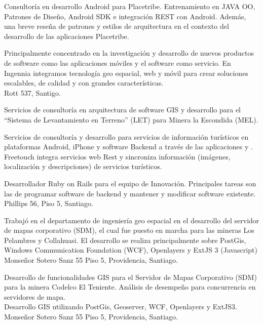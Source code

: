 \documentclass[11pt,letterpaper,roman]{moderncv}
\begin{document}
 {\tchr} {\placetribe} {\stgo} {}
{Consultoría en desarrollo Android para Placetribe. Entrenamiento en JAVA OO,
Patrones de Diseño, Android SDK e integración REST con Android. Además, una
breve reseña de patrones y estilos de arquitectura en el contexto del desarrollo
de las aplicaciones Placetribe.}


 {\cf} {\ingennia} {\stgo} {}
{Principalmente concentrado en la investigación y desarrollo de nuevos productos
de software como las aplicaciones móviles y el software como servicio. En
Ingennia integramos tecnología geo espacial, web y móvil para crear soluciones
escalables, de calidad y con grandes características. \\ Rott 537, Santigo.}

 {\scd} {\jobbitgames} {\stgo} {}
{Servicios de consultoría en arquitectura de software GIS y desarrollo para el
``Sistema de Levantamiento en Terreno'' (LET) para Minera la Escondida (MEL).}


 {\scd} {\mataveri} {\stgo} {}
{Servicios de consultoría y desarrollo para servicios de información turísticos en
plataformas Android, iPhone y software Backend a través de las aplicaciones
\freetouchchile y \freetouchperu. Freetouch integra servicios web Rest y
sincroniza información (imágenes, localización y descripciones) de servicios
turísticos.}

 {\se} {\multicaja} {\stgo} {}
{Desarrollador Ruby on Rails para el equipo de Innovación. Principales tareas
son las de programar software de backend y mantener y modificar software
existente. \\ Phillips 56, Piso 5, Santiago.}


 {\sd} {\ikom} {\stgo} {}
{Trabajó en el departamento de ingeniería geo espacial en el desarrollo del
servidor de mapas corporativo (SDM), el cual fue puesto en marcha para las
mineras Los Pelambres y Collahuasi. El desarrollo se realiza principalmente
sobre PostGis, Windows Communication Foundation (WCF), Openlayers y ExtJS 3
(Javascript) \\ Monseñor Sotero Sanz 55 Piso 5, Providencia, Santiago.} 


  {\intership} {\ikom} {\stgo} {}
{Desarrollo de funcionalidades GIS para el Servidor de Mapas Corporativo (SDM)
para la minera Codelco El Teniente. Análisis de desempeño para concurrencia en
servidores de mapa. \\ Desarrollo GIS utilizando PostGis, Geoserver, WCF,
Openlayers y ExtJS3. \\ Monseñor Sotero Sanz 55 Piso 5, Providencia, Santiago.}
\end{document}

